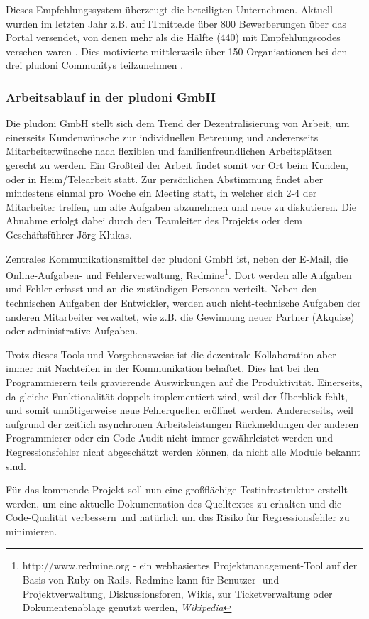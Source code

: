 Dieses Empfehlungssystem überzeugt die beteiligten Unternehmen. Aktuell wurden im letzten Jahr z.B. auf ITmitte.de über 800 Bewerberungen über das Portal versendet, von denen mehr als die Hälfte (440) mit Empfehlungscodes versehen waren \citep{joerg_klukas_startseite_2011}. Dies motivierte mittlerweile über 150 Organisationen bei den drei pludoni Communitys teilzunehmen \citep{joerg_klukas_referenzen_2011}.

\subsubsection{Arbeitsablauf in der pludoni GmbH}
\label{sec:arbeitsablauf}
Die pludoni GmbH stellt sich dem Trend der Dezentralisierung von Arbeit, um einerseits Kundenwünsche zur individuellen Betreuung und andererseits Mitarbeiterwünsche nach flexiblen und familienfreundlichen Arbeitsplätzen gerecht zu werden. Ein Großteil der Arbeit findet somit vor Ort beim Kunden, oder in Heim/Telearbeit statt.
Zur persönlichen Abstimmung findet aber mindestens einmal pro Woche ein Meeting statt, in welcher sich 2-4 der Mitarbeiter treffen, um alte Aufgaben abzunehmen und neue zu diskutieren. Die Abnahme erfolgt dabei durch den Teamleiter des Projekts oder dem Geschäftsführer Jörg Klukas.

Zentrales Kommunikationsmittel der pludoni GmbH ist, neben der E-Mail, die Online-Aufgaben- und Fehlerverwaltung, Redmine\footnote{http://www.redmine.org - ein webbasiertes Projektmanagement-Tool auf der Basis von Ruby on Rails. Redmine kann für Benutzer- und Projektverwaltung, Diskussionsforen, Wikis, zur Ticketverwaltung oder Dokumentenablage genutzt werden, \textit{Wikipedia}}. Dort werden alle Aufgaben und Fehler erfasst und an die zuständigen Personen verteilt. 
Neben den technischen Aufgaben der Entwickler, werden auch nicht-technische Aufgaben der anderen Mitarbeiter verwaltet, wie z.B. die Gewinnung neuer Partner (Akquise) oder administrative Aufgaben. 

Trotz dieses Tools und Vorgehensweise ist die dezentrale Kollaboration aber immer mit Nachteilen in der Kommunikation behaftet. Dies hat bei den Programmierern teils gravierende Auswirkungen auf die Produktivität. Einerseits, da gleiche Funktionalität doppelt implementiert wird, weil der Überblick fehlt, und somit unnötigerweise neue Fehlerquellen eröffnet werden. Andererseits, weil aufgrund der zeitlich asynchronen Arbeitsleistungen Rückmeldungen der anderen Programmierer oder ein Code-Audit nicht immer gewährleistet werden und Regressionsfehler nicht abgeschätzt werden können, da nicht alle Module bekannt sind.


Für das kommende Projekt soll nun eine großflächige Testinfrastruktur erstellt werden, um eine aktuelle Dokumentation des Quelltextes zu erhalten und die Code-Qualität verbessern und natürlich um das Risiko für Regressionsfehler zu minimieren.
